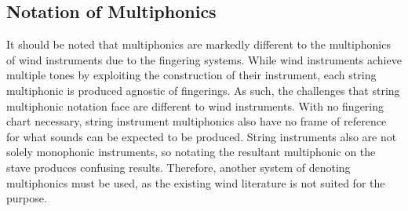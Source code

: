 \begin{table}[]
  \centering
  \end{table}




\subsection{Notation of Multiphonics}

It should be noted that multiphonics are markedly different to the multiphonics of wind instruments due to the fingering systems.
While wind instruments achieve multiple tones by exploiting the construction of their instrument, each string multiphonic is produced agnostic of fingerings.
As such, the challenges that string multiphonic notation face are different to wind instruments.
With no fingering chart necessary, string instrument multiphonics also have no frame of reference for what sounds can be expected to be produced.
String instruments also are not solely monophonic instruments, so notating the resultant multiphonic on the stave produces confusing results.
Therefore, another system of denoting multiphonics must be used, as the existing wind literature is not suited for the purpose.

